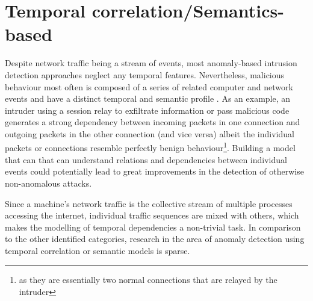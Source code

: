 

\section{Temporal correlation/Semantics-based}

Despite network traffic being a stream of events, most anomaly-based intrusion detection approaches neglect any temporal features. Nevertheless, malicious behaviour most often is composed of  a series  of related computer and network  events and have a distinct temporal and semantic profile \cite{ye2000markov}. As an example, an intruder using a session relay to exfiltrate information or pass malicious code generates a strong dependency between incoming packets in one connection and outgoing packets in the other connection (and vice versa) albeit the individual packets or connections resemble perfectly benign behaviour\footnote{as they are essentially two normal connections that are relayed by the intruder}. Building a model that can that can understand relations and dependencies between individual events could potentially lead to great improvements in the detection of otherwise non-anomalous attacks. 

Since a machine's network traffic is the collective stream of multiple processes accessing the internet, individual traffic sequences are mixed with others, which makes the modelling of temporal dependencies a non-trivial task. In comparison to the other identified categories, research in the area of anomaly detection using temporal correlation or semantic models is sparse. 


